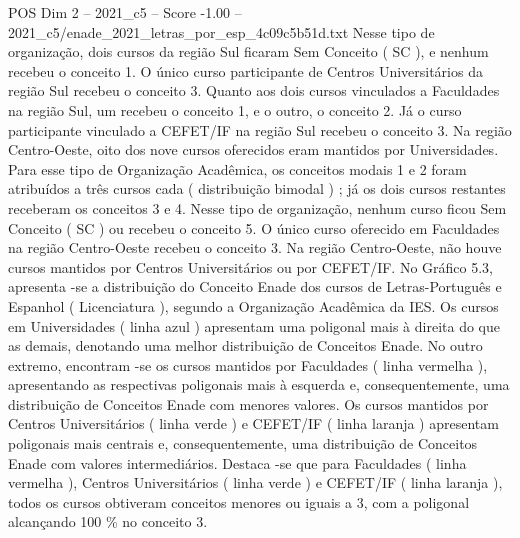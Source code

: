 \begin{textsample}{POS Dim 2 – 2021\_c5 – Score -1.00 – 2021\_c5/enade\_2021\_letras\_por\_esp\_4c09c5b51d.txt}
Nesse tipo de organização, dois cursos da região Sul ficaram Sem Conceito ( SC ), e nenhum recebeu o conceito 1.
O único curso participante de Centros Universitários da região Sul recebeu o conceito 3.
Quanto aos dois cursos vinculados a Faculdades na região Sul, um recebeu o conceito 1, e o outro, o conceito 2.
Já o curso participante vinculado a CEFET/IF na região Sul recebeu o conceito 3.
Na região Centro-Oeste, oito dos nove cursos oferecidos eram mantidos por Universidades.
Para esse tipo de Organização Acadêmica, os conceitos modais 1 e 2 foram atribuídos a três cursos cada ( distribuição bimodal ) ; já os dois cursos restantes receberam os conceitos 3 e 4.
Nesse tipo de organização, nenhum curso ficou Sem Conceito ( SC ) ou recebeu o conceito 5.
O único curso oferecido em Faculdades na região Centro-Oeste recebeu o conceito 3.
Na região Centro-Oeste, não houve cursos mantidos por Centros Universitários ou por CEFET/IF.
No Gráfico 5.3, apresenta -se a distribuição do Conceito Enade dos cursos de Letras-Português e Espanhol ( Licenciatura ), segundo a Organização Acadêmica da IES.
Os cursos em Universidades ( linha azul ) apresentam uma poligonal mais à direita do que as demais, denotando uma melhor distribuição de Conceitos Enade.
No outro extremo, encontram -se os cursos mantidos por Faculdades ( linha vermelha ), apresentando as respectivas poligonais mais à esquerda e, consequentemente, uma distribuição de Conceitos Enade com menores valores.
Os cursos mantidos por Centros Universitários ( linha verde ) e CEFET/IF ( linha laranja ) apresentam poligonais mais centrais e, consequentemente, uma distribuição de Conceitos Enade com valores intermediários.
Destaca -se que para Faculdades ( linha vermelha ), Centros Universitários ( linha verde ) e CEFET/IF ( linha laranja ), todos os cursos obtiveram conceitos menores ou iguais a 3, com a poligonal alcançando 100 \% no conceito 3.

\end{textsample}
